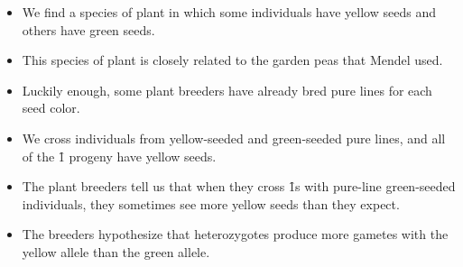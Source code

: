 \begin{frame}
    \begin{itemize}[<+->]
        \item We find a species of plant in which some individuals have yellow
            seeds and others have green seeds.
        \item This species of plant is closely related to the garden peas that
            Mendel used.
        \item Luckily enough, some plant breeders have already bred pure lines
            for each seed color.
        \item We cross individuals from yellow-seeded and green-seeded pure
            lines, and all of the \f{1} progeny have yellow seeds.
        \item The plant breeders tell us that when they cross \f{1}s with
            pure-line green-seeded individuals, they sometimes see more yellow
            seeds than they expect.
        \item The breeders hypothesize that heterozygotes produce more gametes
            with the yellow allele than the green allele.

    \end{itemize}
\end{frame}


